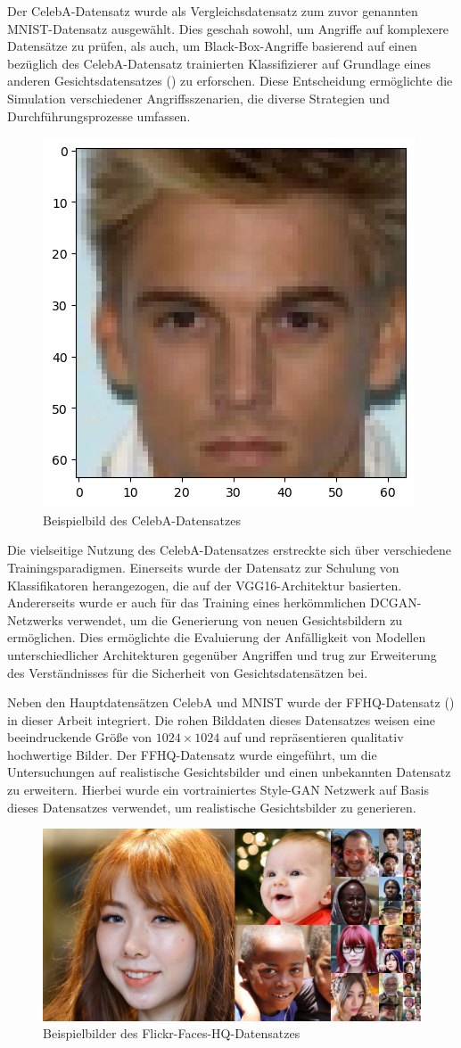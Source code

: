 Der CelebA-Datensatz wurde als Vergleichsdatensatz zum zuvor genannten MNIST-Datensatz ausgewählt. Dies geschah sowohl, um Angriffe auf komplexere Datensätze zu prüfen, als auch, um Black-Box-Angriffe basierend auf einen bezüglich des CelebA-Datensatz trainierten Klassifizierer auf Grundlage eines anderen Gesichtsdatensatzes (\cite{noauthor_nvlabsffhq-dataset_2023}) zu erforschen. Diese Entscheidung ermöglichte die Simulation verschiedener Angriffsszenarien, die diverse Strategien und Durchführungsprozesse umfassen.

\begin{figure}[H]
	\centering
	\includegraphics[width=0.2\linewidth]{Bilder/0_celeba_one.png}
	\caption{Beispielbild des CelebA-Datensatzes}
	\label{img:celeba}
\end{figure}

Die vielseitige Nutzung des CelebA-Datensatzes erstreckte sich über verschiedene Trainingsparadigmen. Einerseits wurde der Datensatz zur Schulung von Klassifikatoren herangezogen, die auf der VGG16-Architektur basierten. Andererseits wurde er auch für das Training eines herkömmlichen DCGAN-Netzwerks verwendet, um die Generierung von \glqq neuen\grqq{} Gesichtsbildern zu ermöglichen. Dies ermöglichte die Evaluierung der Anfälligkeit von Modellen unterschiedlicher Architekturen gegenüber Angriffen und trug zur Erweiterung des Verständnisses für die Sicherheit von Gesichtsdatensätzen bei.

Neben den Hauptdatensätzen CelebA und MNIST wurde der FFHQ-Datensatz (\cite{noauthor_nvlabsffhq-dataset_2023}) in dieser Arbeit integriert. Die \glqq rohen\grqq{} Bilddaten dieses Datensatzes weisen eine beeindruckende Größe von $1024 \times 1024$ auf und repräsentieren qualitativ hochwertige Bilder. Der FFHQ-Datensatz wurde eingeführt, um die Untersuchungen auf realistische Gesichtsbilder und einen unbekannten Datensatz zu erweitern. Hierbei wurde ein vortrainiertes Style-GAN Netzwerk auf Basis dieses Datensatzes verwendet, um realistische Gesichtsbilder zu generieren.

\begin{figure}[H]
	\centering
	\includegraphics[width=0.4\linewidth]{Bilder/ffhq.png}
	\caption{Beispielbilder des Flickr-Faces-HQ-Datensatzes}
	\label{img:ffhq}
\end{figure}

